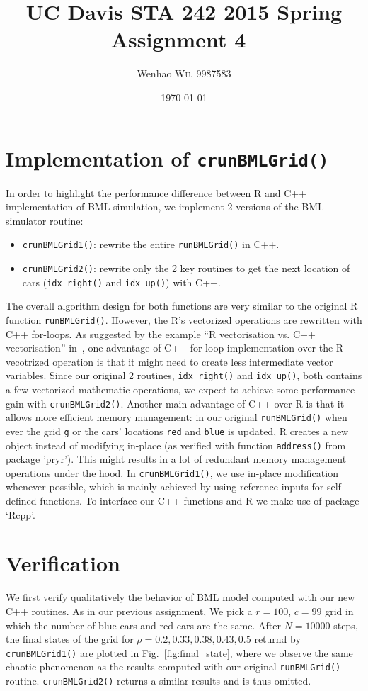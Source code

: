 \documentclass{article}
\title{UC Davis STA 242 2015 Spring Assignment 4~\cite{wu2015bmlgrid_v1.1}} %
\author{Wenhao \textsc{Wu}, 9987583} %
\date{\today} %
\begin{document}
\maketitle %


\section{Implementation of \texttt{crunBMLGrid()}}
In order to highlight the performance difference between R and C++
implementation of BML simulation, we implement 2 versions of the BML simulator
routine:
\begin{itemize}
    \item \texttt{crunBMLGrid1()}: rewrite the entire \texttt{runBMLGrid()} in
    C++.
    \item \texttt{crunBMLGrid2()}: rewrite only the 2 key routines to get the
    next location of cars (\texttt{idx\_right()} and \texttt{idx\_up()}) with
    C++.
\end{itemize}
The overall algorithm design for both functions are very similar to the original
R function \texttt{runBMLGrid()}. However, the R's vectorized operations are
rewritten with C++ for-loops. As suggested by the example ``R vectorisation vs.
C++ vectorisation'' in~\cite{wickham2014advanced}, one advantage of C++ for-loop
implementation over the R vecotrized operation is that it might need to create less
intermediate vector variables. Since our original 2 routines,
\texttt{idx\_right()} and \texttt{idx\_up()}, both contains a few vectorized
mathematic operations, we expect to achieve some performance gain with
\texttt{crunBMLGrid2()}. Another main advantage of C++ over R is that it allows
more efficient memory management: in our original \texttt{runBMLGrid()} when
ever the grid \texttt{g} or the cars' locations \texttt{red} and \texttt{blue}
is updated, R creates a new object instead of modifying in-place (as verified
with function \texttt{address()} from package 'pryr'). This might
results in a lot of redundant memory management operations under the hood. In
\texttt{crunBMLGrid1()}, we use in-place modification whenever possible, which
is mainly achieved by using reference inputs for self-defined functions. To
interface our C++ functions and R we make use of package `Rcpp'.

\section{Verification}
We first verify qualitatively the behavior of BML model computed with our new
C++ routines. As in our previous assignment, We pick a
$r=100$, $c=99$ grid in which the number of blue cars and red cars are the same. After $N =
10000$ steps, the final states of the grid for $\rho = 0.2, 0.33, 0.38, 0.43,
0.5$ returnd by \texttt{crunBMLGrid1()} are plotted in
Fig.~\ref{fig:final_state}, where we observe the same chaotic phenomenon as the
results computed with our original \texttt{runBMLGrid()} routine.
\texttt{crunBMLGrid2()} returns a similar results and is thus omitted.
\end{document}
